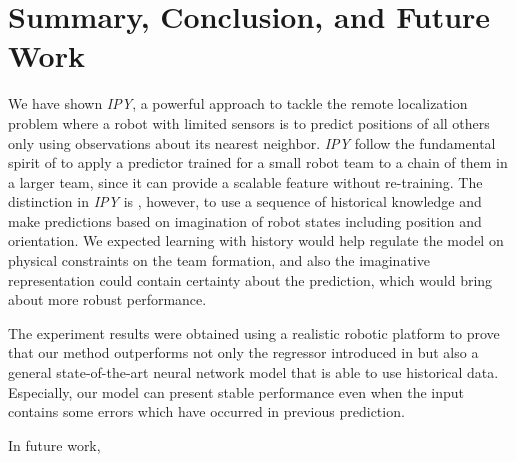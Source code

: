 \documentclass[letterpaper, 10 pt, conference]{ieeeconf}  %
\begin{document}
	\section{Summary, Conclusion, and Future Work}
	\label{sec:conclusion}
	
	We have shown \emph{IPY}, a powerful approach to tackle the remote localization problem 
	where a robot with limited sensors is to predict positions of all others only using 
	observations about its nearest neighbor. 
	\emph{IPY} follow the fundamental spirit of \cite{Choi17} to apply a predictor 
	trained for a small robot team to a chain of them in a larger team, since it 
	can provide a scalable feature without re-training.   
	The distinction in \emph{IPY} is , however, to use a sequence of historical knowledge and 
	make predictions based on imagination of robot states including position and orientation.
	We expected learning with history would help regulate the model on physical constraints on 
	the team formation, and also the imaginative representation could contain 
	certainty about the prediction, which would bring about more robust performance. 
	
	The experiment results were obtained using a realistic robotic platform to prove 
	that our method outperforms not only the regressor
	introduced in \cite{Choi17} but also a general state-of-the-art neural network 
	model that is able to use historical data. Especially, our model can present 
	stable performance even when the input contains some errors which have occurred in 
	previous prediction. 
	  
	
	In future work, 
	
	
{\small
	
	
}
\end{document}
